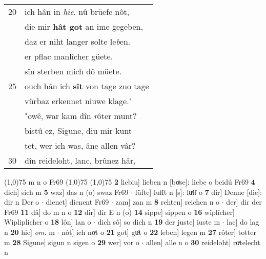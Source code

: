 \documentclass[8pt,a4paper,notitlepage]{article}
\begin{document}
\begin{table}[ht]
\begin{minipage}[t]{0.5\linewidth}
\begin{tabular}{rl}
20 & ich hân in \textit{hie}. nû brüefe nôt,\\ 
 & die mir \textbf{hât got} an ime gegeben,\\ 
 & daz er niht langer solte le\textit{b}en.\\ 
 & er pflac manlîcher güete.\\ 
 & sîn sterben mich dô müete.\\ 
25 & ouch hân ich \textbf{sît} von tage zuo tage\\ 
 & vürbaz erkennet niuwe klage."\\ 
 & "owê, war kam dîn \textit{r}ôter munt?\\ 
 & bistû ez, Sigune, diu mir kunt\\ 
 & tet, wer ich was, âne allen vâr?\\ 
30 & dîn reideloht, lanc, brûnez hâr,\\ 
\end{tabular}
\scriptsize
\line(1,0){75} \newline
m n o Fr69 \newline
\line(1,0){75} \newline
\newline
\line(1,0){75} \newline
\textbf{2} liebiu] lieben n [boͯse]: liebe o beidú Fr69 \textbf{4} dich] sich m \textbf{5} waz] das n (o) swaz Fr69  $\cdot$ lüfte] lufft n [s]: luͯff o \textbf{7} dir] Denne [die]: dir n Der o  $\cdot$ dienet] dienent Fr69  $\cdot$ zam] zan m \textbf{8} rehten] reichen n o  $\cdot$ der] dir der Fr69 \textbf{11} dâ] do m n o \textbf{12} dir] dir E n (o) \textbf{14} sippe] sippen o \textbf{16} wîplîcher] Wipliplicher o \textbf{18} lôn] lan o  $\cdot$ dich sô] so dich n \textbf{19} der juste] iuste m  $\cdot$ lac] do lag n \textbf{20} hie] \textit{om.} m  $\cdot$ nôt] ich noͯt o \textbf{21} got] guͦt o \textbf{22} leben] legen m \textbf{27} rôter] totter m \textbf{28} Sigune] sigun n sigen o \textbf{29} wer] vor o  $\cdot$ allen] alle n o \textbf{30} reideloht] roͯtelecht n \newline
\end{minipage}
\end{table}
\newpage
\end{document}
